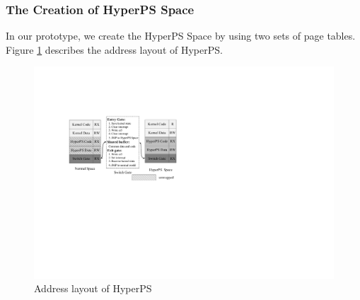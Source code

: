 \subsubsection{The Creation of HyperPS Space}%
\label{ssub:hyperps_space_creation}

In our prototype, we create the HyperPS Space by using two sets of page tables.  
Figure \ref{fig:address} describes the address layout of HyperPS. 
\begin{figure}[htpb]
    \centering
    \includegraphics[width=0.8\linewidth]{IMG/address.pdf}
    \caption{Address layout of HyperPS}%
    \label{fig:address}
\end{figure}


